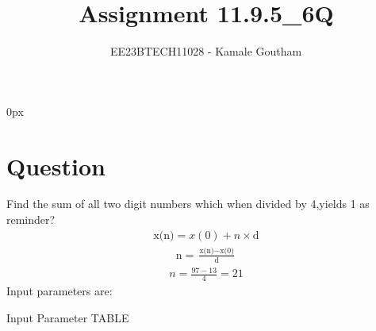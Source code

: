 \documentclass[journal,12pt,twocolumn]{IEEEtran}
\theoremstyle{remark}
\begin{document}
\parindent 0px

\title{Assignment 11.9.5\_6Q}
\author{EE23BTECH11028 - Kamale Goutham$^{}$%
}
\maketitle
\newpage
\bigskip
\section*{Question}
Find the sum of all two digit numbers which when divided by 4,yields 1 as reminder?\\
\solution 
  \begin{align}
      \text{x(n)}=x(0)+n\times{\text{d}}
  \end{align}
  \begin{align}
    \text{n} = \frac{\text{x(n)} - \text{x(0)}}{\text{d}} 
  \end{align}
  \begin{align}
      n=\frac{97-13}{4}=21
  \end{align}
Input parameters are:\\

\begin{table}[ht]
    \centering
    \def\arraystretch{1.5}
    
    \caption{Input Parameter TABLE}
    \label{tab:11.9.5.6}
\end{table}
\end{document}
